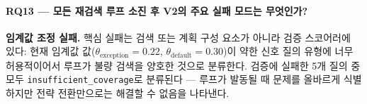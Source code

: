 \paragraph{RQ13 --- 모든 재검색 루프 소진 후 V2의 주요 실패 모드는 무엇인가?} \textbf{임계값 조정 실패.} 핵심 실패는 검색 또는 계획 구성 요소가 아니라 검증 스코어러에 있다: 현재 임계값 값($\theta_{\text{exception}}{=}0.22$, $\theta_{\text{default}}{=}0.30$)이 약한 신호 질의 유형에 너무 허용적이어서 루프가 불량 검색을 양호한 것으로 분류한다. 검증에 실패한 5개 질의 중 모두 \texttt{insufficient\_coverage}로 분류된다 --- 루프가 발동될 때 문제를 올바르게 식별하지만 전략 전환만으로는 해결할 수 없음을 나타낸다.
